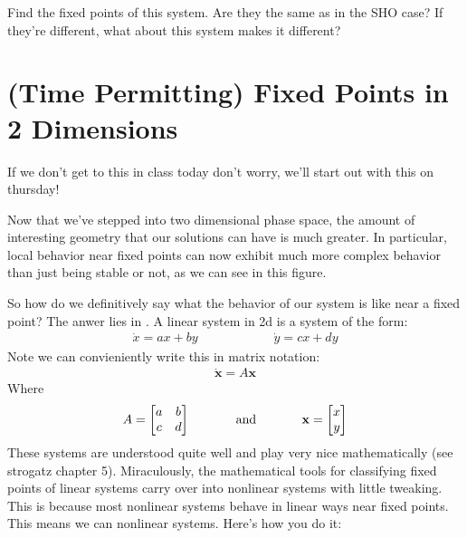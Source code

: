 \documentclass[letterpaper,10pt,english]{jupyterBook}
\begin{document}
\sphinxAtStartPar
Find the fixed points of this system. Are they the same as in the SHO case? If they’re different, what about this system makes it different?


\section{(Time Permitting) Fixed Points in 2 Dimensions}
\label{\detokenize{content/1_mechanics/dynamical_1:time-permitting-fixed-points-in-2-dimensions}}
\sphinxAtStartPar
If we don’t get to this in class today don’t worry, we’ll start out with this on thursday!

\sphinxAtStartPar
Now that we’ve stepped into two dimensional phase space, the amount of interesting geometry that our solutions can have is much greater. In particular, local behavior near fixed points can now exhibit much more complex behavior than just being stable or not, as we can see in this figure.



\sphinxAtStartPar
So how do we definitively say what the behavior of our system is like near a fixed point? The anwer lies in . A linear system in 2d is a system of the form:
\begin{equation*}
\begin{split}
\dot{x} = ax + by \hspace{1in} \dot{y} = cx + dy
\end{split}
\end{equation*}
\sphinxAtStartPar
Note we can convieniently write this in matrix notation:
\begin{equation*}
\begin{split}
\dot{\mathbf{x}} = A\mathbf{x}
\end{split}
\end{equation*}
\sphinxAtStartPar
Where
\begin{equation*}
\begin{split}
A = 
\begin{bmatrix}
a & b \\
c & d
\end{bmatrix}
\hspace{0.5in}\text{and} \hspace{0.5in} \mathbf{x} = \begin{bmatrix} x \\ y \end{bmatrix}
\end{split}
\end{equation*}
\sphinxAtStartPar
These systems are understood quite well and play very nice mathematically (see strogatz chapter 5). Miraculously, the mathematical tools for classifying fixed points of linear systems carry over into nonlinear systems with little tweaking. This is because most nonlinear systems behave in linear ways near fixed points. This means we can  nonlinear systems. Here’s how you do it:
\end{document}
